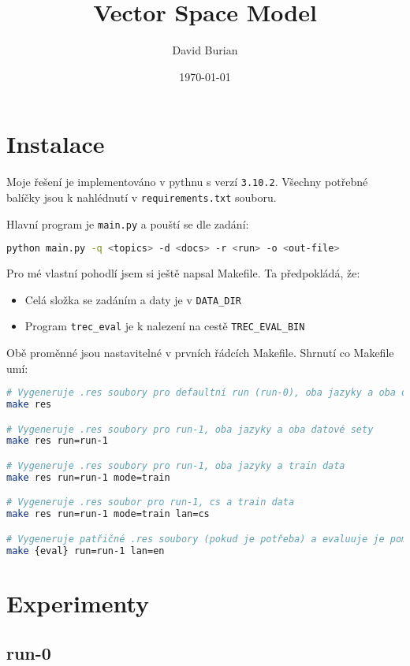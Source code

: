 \documentclass[10pt]{article}
\author{David Burian}
\date{\today}
\title{Vector Space Model}
\begin{document}
\maketitle


\section{Instalace}

Moje řešení je implementováno v pythnu s verzí \verb|3.10.2|. Všechny potřebné
balíčky jsou k nahlédnutí v \verb|requirements.txt| souboru.

Hlavní program je \verb|main.py| a pouští se dle zadání:
\begin{lstlisting}[language=bash]
python main.py -q <topics> -d <docs> -r <run> -o <out-file>
\end{lstlisting}

Pro mé vlastní pohodlí jsem si ještě napsal Makefile. Ta předpokládá, že:

\begin{itemize}
    \item Celá složka se zadáním a daty je v \verb|DATA_DIR|
    \item Program \verb|trec_eval| je k nalezení na cestě \verb|TREC_EVAL_BIN|
\end{itemize}

Obě proměnné jsou nastavitelné v prvních řádcích Makefile. Shrnutí co Makefile
umí:

\begin{lstlisting}[language=bash,texcl=true]
# Vygeneruje .res soubory pro defaultní run (run-0), oba jazyky a oba datové sety
make res

# Vygeneruje .res soubory pro run-1, oba jazyky a oba datové sety
make res run=run-1

# Vygeneruje .res soubory pro run-1, oba jazyky a train data
make res run=run-1 mode=train

# Vygeneruje .res soubor pro run-1, cs a train data
make res run=run-1 mode=train lan=cs

# Vygeneruje patřičné .res soubory (pokud je potřeba) a evaluuje je pomocí trec\_eval
make {eval} run=run-1 lan=en
\end{lstlisting}

\section{Experimenty}

\subsection{run-0}
\end{document}
